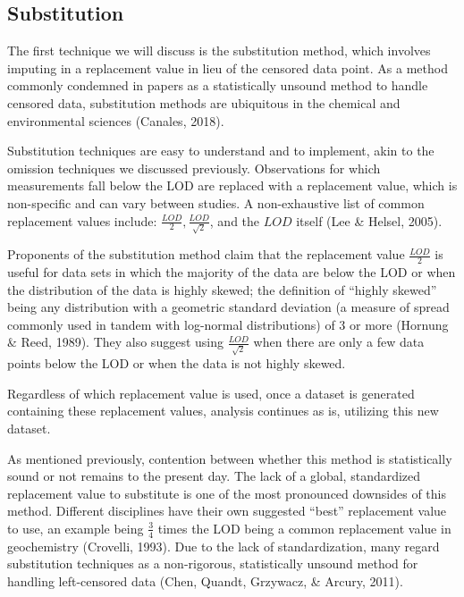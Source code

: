 \documentclass[12pt, twoside]{amherstthesis}
\begin{document}
\hypertarget{Substitution}{%
\subsection{Substitution}\label{Substitution}}

The first technique we will discuss is the substitution method, which involves imputing in a replacement value in lieu of the censored data point. As a method commonly condemned in papers as a statistically unsound method to handle censored data, substitution methods are ubiquitous in the chemical and environmental sciences (Canales, 2018).

Substitution techniques are easy to understand and to implement, akin to the omission techniques we discussed previously. Observations for which measurements fall below the LOD are replaced with a replacement value, which is non-specific and can vary between studies. A non-exhaustive list of common replacement values include: \(\frac{LOD}{2}, \frac{LOD}{\sqrt2}\), and the \(LOD\) itself (Lee \& Helsel, 2005).

Proponents of the substitution method claim that the replacement value \(\frac{LOD}{2}\) is useful for data sets in which the majority of the data are below the LOD or when the distribution of the data is highly skewed; the definition of ``highly skewed'' being any distribution with a geometric standard deviation (a measure of spread commonly used in tandem with log-normal distributions) of 3 or more (Hornung \& Reed, 1989). They also suggest using \(\frac{LOD}{\sqrt2}\) when there are only a few data points below the LOD or when the data is not highly skewed.

Regardless of which replacement value is used, once a dataset is generated containing these replacement values, analysis continues as is, utilizing this new dataset.

As mentioned previously, contention between whether this method is statistically sound or not remains to the present day. The lack of a global, standardized replacement value to substitute is one of the most pronounced downsides of this method. Different disciplines have their own suggested ``best'' replacement value to use, an example being \(\frac{3}{4}\) times the LOD being a common replacement value in geochemistry (Crovelli, 1993). Due to the lack of standardization, many regard substitution techniques as a non-rigorous, statistically unsound method for handling left-censored data (Chen, Quandt, Grzywacz, \& Arcury, 2011).
\end{document}
